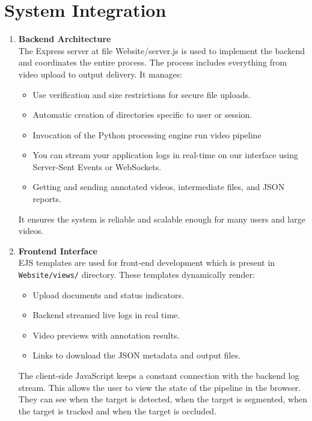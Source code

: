 \documentclass[12pt,a4paper]{report}
\theoremstyle{definition}
\theoremstyle{remark}
\begin{document}
\section{System Integration}
\begin{enumerate}

    \item \textbf{Backend Architecture}\\
    The Express server at file Website/server.js is used to implement the backend and coordinates the entire process. The process includes everything from video upload to output delivery. It manages:
    \begin{itemize}
        \item Use verification and size restrictions for secure file uploads.
        \item Automatic creation of directories specific to user or session.
        \item Invocation of the Python processing engine run video pipeline
        \item You can stream your application logs in real-time on our interface using Server-Sent Events or WebSockets.
        \item Getting and sending annotated videos, intermediate files, and JSON reports.
    \end{itemize}
    It ensures the system is reliable and scalable enough for many users and large videos.

    \item \textbf{Frontend Interface}\\
    EJS templates are used for front-end development which is present in \texttt{Website/views/} directory. These templates dynamically render:
    \begin{itemize}
        \item Upload documents and status indicators.
        \item Backend streamed live logs in real time.
        \item Video previews with annotation results.
        \item Links to download the JSON metadata and output files.
    \end{itemize}
    The client-side JavaScript keeps a constant connection with the backend log stream.  This allows the user to view the state of the pipeline in the browser.  They can see when the target is detected, when the target is segmented, when the target is tracked and when the target is occluded.


\end{enumerate}
\end{document}
